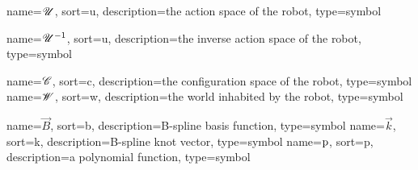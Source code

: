 	{%
		name=\ensuremath{\vecspace{U}},
		sort=u,
		description=the action space of the robot,
		type=symbol
	}
	\newcommand{\actionspace}{\gls{sym:actionspace}}

	{%
		name=\ensuremath{\vecspace{U}^{-1}},
		sort=u,
		description=the inverse action space of the robot,
		type=symbol
	}
	\newcommand{\invactionspace}{\gls{sym:invactionspace}}

	{%
		name=\ensuremath{\vecspace{C}},
		sort=c,
		description=the configuration space of the robot,
		type=symbol
	}
	\newcommand{\configurationspace}{\gls{sym:configurationspace}}
	{%
		name=\ensuremath{\vecspace{W}},
		sort=w,
		description=the world inhabited by the robot,
		type=symbol
	}
	\newcommand{\world}{\gls{sym:worldspace}}

	{%
		name=\ensuremath{\vec{B}},
		sort=b,
		description=B-spline basis function,
		type=symbol
	}
	\newcommand{\bspline}{\gls{sym:bspline}}
	{%
		name=\ensuremath{\vec{k}},
		sort=k,
		description=B-spline knot vector,
		type=symbol
	}
	\newcommand{\knot}{\gls{sym:knot}}
	{%
		name=\ensuremath{\func{p}},
		sort=p,
		description=a polynomial function,
		type=symbol
	}
	\newcommand{\polynomial}{\gls{sym:polynomial}}

